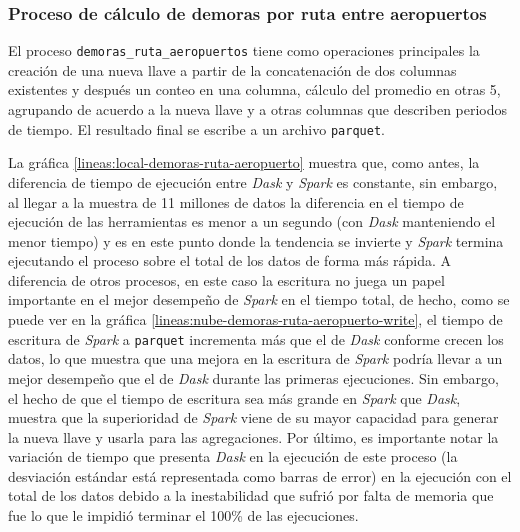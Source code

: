 \subsubsection{Proceso de cálculo de demoras por ruta entre aeropuertos}

El proceso \texttt{demoras\_ruta\_aeropuertos} tiene como operaciones principales  la creación de una nueva llave a partir de la concatenación de dos columnas existentes y después un conteo en una columna, cálculo del promedio en otras 5, agrupando de acuerdo a la nueva llave y a otras columnas que describen periodos de tiempo. El resultado final se escribe a un archivo \texttt{parquet}.

La gráfica \ref{lineas:local-demoras-ruta-aeropuerto}
muestra que, como antes, la diferencia de tiempo de ejecución entre \textit{Dask} y \textit{Spark} es constante, sin embargo, al llegar a la muestra de 11 millones de datos la diferencia en el tiempo de ejecución de las herramientas es menor a un segundo (con \textit{Dask} manteniendo el menor tiempo) y es en este punto donde la tendencia se invierte y \textit{Spark} termina ejecutando el proceso sobre el total de los datos de forma más rápida. A diferencia de otros procesos, en este caso la escritura no juega un papel importante en el mejor desempeño de \textit{Spark} en el tiempo total, de hecho, como se puede ver en la gráfica \ref{lineas:nube-demoras-ruta-aeropuerto-write}, el tiempo de escritura de \textit{Spark} a \texttt{parquet} incrementa más que el de \textit{Dask} conforme crecen los datos, lo que 
muestra que una mejora en la escritura de \textit{Spark} podría llevar a un mejor desempeño que el de \textit{Dask} durante las primeras ejecuciones. Sin embargo, el hecho de que el tiempo de escritura sea más grande en \textit{Spark} que \textit{Dask}, muestra que la superioridad de \textit{Spark} viene de su mayor capacidad para generar la nueva llave y usarla para las agregaciones. Por último, es importante notar la variación de tiempo que presenta  \textit{Dask} en la ejecución de este proceso (la desviación estándar está representada como barras de error) en la ejecución con el total de los datos debido a la inestabilidad que sufrió por falta de memoria que fue lo que le impidió terminar el 100\% de las ejecuciones. 


